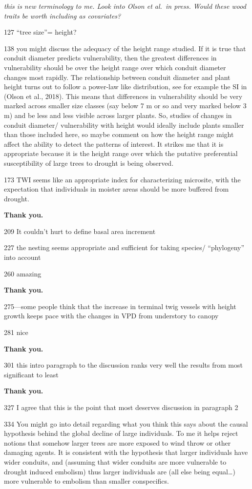 \documentclass[
]{article}
\begin{document}
\emph{this is new terminology to me. Look into Olson et al.~in press.
Would these wood traits be worth including as covariates?}

127 ``tree size''= height?

138 you might discuss the adequacy of the height range studied. If it is
true that conduit diameter predicts vulnerability, then the greatest
differences in vulnerability should be over the height range over which
conduit diameter changes most rapidly. The relationship between conduit
diameter and plant height turns out to follow a power-law like
distribution, see for example the SI in (Olson et al., 2018). This means
that differences in vulnerability should be very marked across smaller
size classes (say below 7 m or so and very marked below 3 m) and be less
and less visible across larger plants. So, studies of changes in conduit
diameter/ vulnerability with height would ideally include plants smaller
than those included here, so maybe comment on how the height range might
affect the ability to detect the patterns of interest. It strikes me
that it is appropriate because it is the height range over which the
putative preferential susceptibility of large trees to drought is being
observed.

173 TWI seems like an appropriate index for characterizing microsite,
with the expectation that individuals in moister areas should be more
buffered from drought.

\textbf{Thank you.}

209 It couldn't hurt to define basal area increment

227 the nesting seems appropriate and sufficient for taking species/
``phylogeny'' into account

260 amazing

\textbf{Thank you.}

275---some people think that the increase in terminal twig vessels with
height growth keeps pace with the changes in VPD from understory to
canopy

281 nice

\textbf{Thank you.}

301 this intro paragraph to the discussion ranks very well the results
from most significant to least

\textbf{Thank you.}

327 I agree that this is the point that most deserves discussion in
paragraph 2

334 You might go into detail regarding what you think this says about
the causal hypothesis behind the global decline of large individuals. To
me it helps reject notions that somehow larger trees are more exposed to
wind throw or other damaging agents. It is consistent with the
hypothesis that larger individuals have wider conduits, and (assuming
that wider conduits are more vulnerable to drought induced embolism)
thus larger individuals are (all else being equal\ldots) more vulnerable
to embolism than smaller conspecifics.
\end{document}
